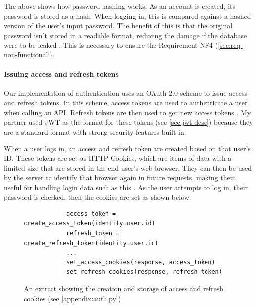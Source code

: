 \documentclass[12pt, letterpaper]{article}
\begin{document}
\begin{flushleft}
The above shows how password hashing works. As an account is created, its password is stored as a hash. When logging in, this is compared against a hashed version of the user's input password. The benefit of this is that the original password isn't stored in a readable format, reducing the damage if the database were to be leaked \cite{password-security}. This is necessary to ensure the Requirement NF4 (\ref{sec:req-non-functional}).
\end{flushleft}

\paragraph{Issuing access and refresh tokens}\label{sec:access-and-refresh}

\begin{flushleft}
Our implementation of authentication uses an OAuth 2.0 scheme to issue access and refresh tokens. In this scheme, access tokens are used to authenticate a user when calling an API. Refresh tokens are then used to get new access tokens \cite{oauth-2}. My partner used JWT as the format for these tokens (see \ref{sec:jwt-desc}) because they are a standard format with strong security features built in.
\end{flushleft}

\begin{flushleft}
When a user logs in, an access and refresh token are created based on that user's ID. These tokens are set as HTTP Cookies, which are items of data with a limited size that are stored in the end user's web browser. They can then be used by the server to identify that browser again in future requests, making them useful for handling login data such as this \cite{http-cookies}. As the user attempts to log in, their password is checked, then the cookies are set as shown below.
\end{flushleft}

\begin{flushleft}
\begin{figure}[H]
\begin{verbatim}
            access_token = create_access_token(identity=user.id)
            refresh_token = create_refresh_token(identity=user.id)
            ...
            set_access_cookies(response, access_token)
            set_refresh_cookies(response, refresh_token)
\end{verbatim}
\caption{An extract showing the creation and storage of access and refresh cookies (see \ref{appendix:auth.py})}
\end{figure}
\end{flushleft}
\end{document}
